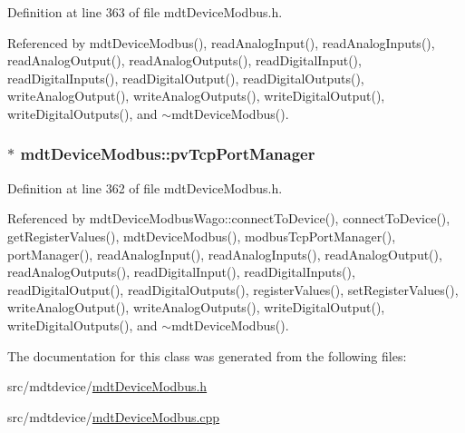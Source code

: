 Definition at line 363 of file mdt\-Device\-Modbus.\-h.



Referenced by mdt\-Device\-Modbus(), read\-Analog\-Input(), read\-Analog\-Inputs(), read\-Analog\-Output(), read\-Analog\-Outputs(), read\-Digital\-Input(), read\-Digital\-Inputs(), read\-Digital\-Output(), read\-Digital\-Outputs(), write\-Analog\-Output(), write\-Analog\-Outputs(), write\-Digital\-Output(), write\-Digital\-Outputs(), and $\sim$mdt\-Device\-Modbus().

\hypertarget{classmdt_device_modbus_a9ecbac63c29b229ab01f5fdb26008c95}{
\subsubsection[{pv\-Tcp\-Port\-Manager}]{$\ast$ mdt\-Device\-Modbus\-::pv\-Tcp\-Port\-Manager\hspace{0.3cm}{\ttfamily [protected]}}}\label{classmdt_device_modbus_a9ecbac63c29b229ab01f5fdb26008c95}


Definition at line 362 of file mdt\-Device\-Modbus.\-h.



Referenced by mdt\-Device\-Modbus\-Wago\-::connect\-To\-Device(), connect\-To\-Device(), get\-Register\-Values(), mdt\-Device\-Modbus(), modbus\-Tcp\-Port\-Manager(), port\-Manager(), read\-Analog\-Input(), read\-Analog\-Inputs(), read\-Analog\-Output(), read\-Analog\-Outputs(), read\-Digital\-Input(), read\-Digital\-Inputs(), read\-Digital\-Output(), read\-Digital\-Outputs(), register\-Values(), set\-Register\-Values(), write\-Analog\-Output(), write\-Analog\-Outputs(), write\-Digital\-Output(), write\-Digital\-Outputs(), and $\sim$mdt\-Device\-Modbus().



The documentation for this class was generated from the following files\-:\begin{DoxyCompactItemize}
\item 
src/mdtdevice/\hyperlink{mdt_device_modbus_8h}{mdt\-Device\-Modbus.\-h}\item 
src/mdtdevice/\hyperlink{mdt_device_modbus_8cpp}{mdt\-Device\-Modbus.\-cpp}\end{DoxyCompactItemize}
